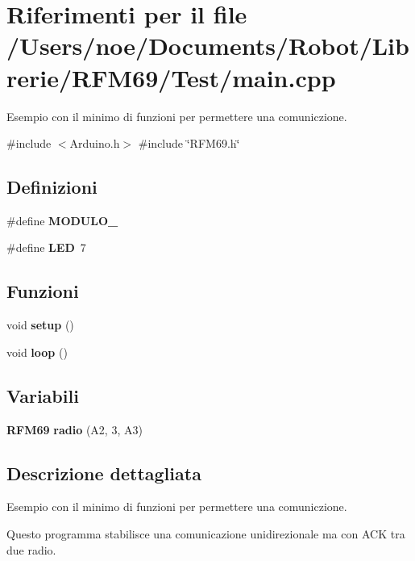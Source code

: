 \section{Riferimenti per il file /\+Users/noe/\+Documents/\+Robot/\+Librerie/\+R\+F\+M69/\+Test/main.cpp}
\label{main_8cpp}


Esempio con il minimo di funzioni per permettere una comuniczione.  


{\ttfamily \#include $<$Arduino.\+h$>$}\newline
{\ttfamily \#include \char`\"{}R\+F\+M69.\+h\char`\"{}}\newline
\subsection*{Definizioni}
\begin{DoxyCompactItemize}
\item 
\mbox{\label{main_8cpp_af9b210b522e823b8f560622e848af827}} 
\#define {\bfseries M\+O\+D\+U\+L\+O\+\_}
\item 
\mbox{\label{main_8cpp_aeb7a7ba1ab7e0406f1b5ab36d579f585}} 
\#define {\bfseries L\+ED}~7
\end{DoxyCompactItemize}
\subsection*{Funzioni}
\begin{DoxyCompactItemize}
\item 
\mbox{\label{main_8cpp_a4fc01d736fe50cf5b977f755b675f11d}} 
void {\bfseries setup} ()
\item 
\mbox{\label{main_8cpp_afe461d27b9c48d5921c00d521181f12f}} 
void {\bfseries loop} ()
\end{DoxyCompactItemize}
\subsection*{Variabili}
\begin{DoxyCompactItemize}
\item 
\mbox{\label{main_8cpp_a4801927c117e14f77944af1e13348ffe}} 
\textbf{ R\+F\+M69} {\bfseries radio} (A2, 3, A3)
\end{DoxyCompactItemize}


\subsection{Descrizione dettagliata}
Esempio con il minimo di funzioni per permettere una comuniczione. 

Questo programma stabilisce una comunicazione unidirezionale ma con A\+CK tra due radio. 
